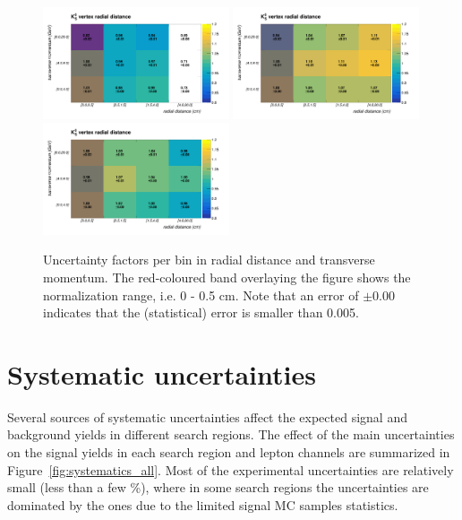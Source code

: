 \begin{figure}[h!]
	\centering	
	\includegraphics[width=0.49\textwidth]{Figures/c6/efficiencies/2dplots/2016tot/smallrange}
	\includegraphics[width=0.49\textwidth]{Figures/c6/efficiencies/2dplots/2017tot/smallrange}\\
	\includegraphics[width=0.49\textwidth]{Figures/c6/efficiencies/2dplots/2018tot/smallrange}
	\caption{Uncertainty factors per bin in radial distance and
          transverse momentum. The red-coloured band overlaying the
          figure shows the normalization range, i.e. 0 - 0.5 cm. Note
          that an error of $\pm 0.00$ indicates that the (statistical)
          error is smaller than 0.005. \luka}
	\label{fig:2dplots}
\end{figure}

\section{Systematic uncertainties}\label{sec:llsystematic}
Several sources of systematic uncertainties affect the expected signal
and background yields in different search regions. 
The effect of the main uncertainties on the signal yields in each
search region and lepton channels are summarized in
Figure~\ref{fig:systematics_all}. 
Most of the experimental uncertainties are relatively small (less than
a few \%), where in some search regions the uncertainties are
dominated by the ones due to the limited signal MC samples statistics. 

